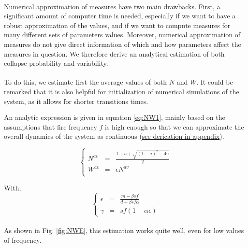 \documentclass{article}
\begin{document}
\paragraph{} %
Numerical approximation of measures have two main drawbacks. First, a significant amount of computer time is needed, especially if we want to have a robust approximation of the values, and if we want to compute measures for many different sets of parameters values. Moreover, numerical approximation of measures do not give direct information of which and how parameters affect the measures in question. We therefore derive an analytical estimation of both collapse probability and variability. 



\paragraph{}
\label{average_estimation}
To do this, we estimate first the average values of both $N$ and $W$. It could be remarked that it is also helpful for initialization of numerical simulations of the system, as it allows for shorter transitions times. 

An analytic expression is given in equation \ref{eq:NW1}, mainly based on the assumptions that fire frequency $f$ is high enough so that we can approximate the overall dynamics of the system as continuous (\hyperref[average]{see derication in appendix}).

\begin{equation} \label{eq:NW1}
\left\lbrace
\begin{array}{rcl}
N^{av} & = & \frac{1+a+\sqrt{(1-a)^2-4\gamma}}{2} \\
W^{av} & = & \epsilon N^{av} \\
\end{array}
\right.
\end{equation}

With,  
\begin{equation}   \label{eq:NW2}
\left\lbrace
\begin{array}{rcl}
\epsilon & = & \frac{m-\beta s f}{d + \beta s f \alpha} \\
\gamma & = & sf(1+\alpha\epsilon)
\end{array}
\right.
\end{equation}


\paragraph{}
As shown in Fig. \ref{fig:NWE}, this estimation works quite well, even for low values of frequency.
\end{document}

